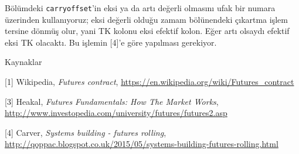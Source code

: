 \documentclass[12pt,fleqn]{article}\usepackage{../../common}
\begin{document}
Bölümdeki \verb!carryoffset!'in eksi ya da artı değerli olmasını ufak bir numara
üzerinden kullanıyoruz; eksi değerli olduğu zamam bölünendeki çıkartma işlem
tersine dönmüş olur, yani TK kolonu eksi efektif kolon. Eğer artı olsaydı
efektif eksi TK olacaktı. Bu işlemin [4]'e göre yapılması gerekiyor. 

Kaynaklar

[1] Wikipedia, {\em Futures contract}, \url{https://en.wikipedia.org/wiki/Futures_contract}

[3] Heakal, {\em Futures Fundamentals: How The Market Works}, \url{http://www.investopedia.com/university/futures/futures2.asp}

[4] Carver, {\em Systems building - futures rolling}, \url{http://qoppac.blogspot.co.uk/2015/05/systems-building-futures-rolling.html}
\end{document}
